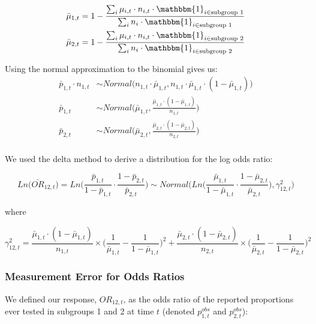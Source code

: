 \documentclass{article}
\begin{document}
\begin{align}
\bar{\mu}_{1,t} &= 1 - \frac{\sum_i \mu_{i,t} \cdot n_{i,t} \cdot \mathbbm{1}_{i \in \text{subgroup }1}}{\sum_i n_i \cdot \mathbbm{1}_{i \in \text{subgroup }1}}\\
\bar{\mu}_{2,t} &= 1 - \frac{\sum_i \mu_{i,t} \cdot n_{i,t} \cdot \mathbbm{1}_{i \in \text{subgroup }2}}{\sum_i n_i \cdot \mathbbm{1}_{i \in \text{subgroup }2}}
\end{align}

Using the normal approximation to tbe binomial gives us:
\begin{align}
	\bar{p}_{1,t} \cdot n_{1,t} &\sim Normal\Big(n_{1,t} \cdot \bar{\mu}_{1,t}, n_{1,t} \cdot \bar{\mu}_{1,t} \cdot (1-\bar{\mu}_{1,t})\Big)\\
	\bar{p}_{1,t} &\sim Normal\Bigg(\bar{\mu}_{1,t}, \frac{\bar{\mu}_{1,t} \cdot (1-\bar{\mu}_{1,t})}{n_{1,t}}\Bigg)\\
	\bar{p}_{2,t} &\sim Normal\Bigg(\bar{\mu}_{2,t}, \frac{\bar{\mu}_{2,t} \cdot (1-\bar{\mu}_{2,t})}{n_{2,t}}\Bigg)\\
\end{align}

We used the delta method to derive a distribution for the log odds ratio:

\begin{equation}
	Ln\big(\bar{OR}_{12,t}\big) = Ln\bigg(\frac{\bar{p}_{1,t}}{1-\bar{p}_{1,t}} \cdot {\frac{1 - \bar{p}_{2,t}}{\bar{p}_{2,t}}}\bigg) \sim Normal\Bigg(Ln\bigg(\frac{\bar{\mu}_{1,t}}{1-\bar{\mu}_{1,t}} \cdot {\frac{1 - \bar{\mu}_{2,t}}{\bar{\mu}_{2,t}}}\bigg), \gamma_{12,t}^2\Bigg)
\end{equation}

where 

\begin{equation}
	\gamma_{12,t}^2 = \frac{\bar{\mu}_{1,t} \cdot (1-\bar{\mu}_{1,t})}{n_{1,t}} \times \bigg(\frac{1}{\bar{\mu}_{1,t}} - \frac{1}{1-\bar{\mu}_{1,t}} \bigg)^2 + \frac{\bar{\mu}_{2,t} \cdot (1-\bar{\mu}_{2,t})}{n_{2,t}} \times \bigg(\frac{1}{\bar{\mu}_{2,t}} - \frac{1}{1-\bar{\mu}_{2,t}} \bigg)^2
\end{equation}

\subsubsection{Measurement Error for Odds Ratios}

We defined our response, $OR_{12,t}$, as the odds ratio of the reported proportions ever tested in subgroups 1 and 2 at time $t$ (denoted $p^{obs}_{1,t}$ and $p^{obs}_{2,t}$):
\end{document}
